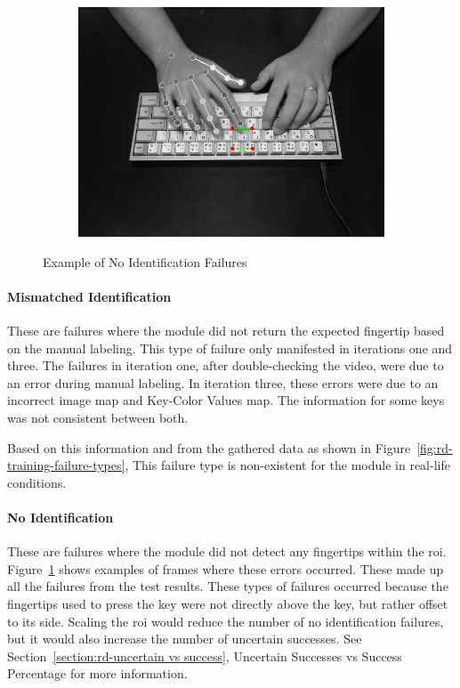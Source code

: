 \documentclass{report}
\begin{document}
\begin{figure}[H]
\begin{subfigure}{.5\textwidth}
  \includegraphics[width=.995\linewidth]{failure-2.png}
\end{subfigure}
\caption{Example of No Identification Failures}
\label{fig:rd-training-sample}
\end{figure}

\paragraph{Mismatched Identification}
These are failures where the module did not return the expected fingertip based
on the manual labeling. This type of failure only manifested in iterations one
and three. The failures in iteration one, after double-checking the video, were
due to an error during manual labeling. In iteration three, these errors were
due to an incorrect image map and Key-Color Values map. The information for some
keys was not consistent between both.

Based on this information and from the gathered data as shown in
Figure~\ref{fig:rd-training-failure-types}, This failure type is non-existent
for the module in real-life conditions.

\paragraph{No Identification}
These are failures where the module did not detect any fingertips within the
\ac{roi}. Figure~\ref{fig:rd-training-sample} shows examples of frames where
these errors occurred. These made up all the failures from the test results.
These types of failures occurred because the fingertips used to press the key
were not directly above the key, but rather offset to its side. Scaling the
\ac{roi} would reduce the number of no identification failures, but it would
also increase the number of uncertain successes. See
Section~\ref{section:rd-uncertain vs success}, Uncertain Successes vs Success
Percentage for more information.
\end{document}
